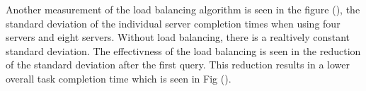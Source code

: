 \documentclass{article}
\begin{document}
\begin{multicols}{2}
\noindent{}

Another measurement of the load balancing algorithm is seen in the figure (), the standard deviation of the individual server completion times when using four servers and eight servers.  Without load balancing, there is a realtively constant standard deviation.  The effectivness of the load balancing is seen in the reduction of the standard deviation after the first query.  This reduction results in a lower overall task completion time which is seen in Fig ().


\end{multicols}
\end{document}
